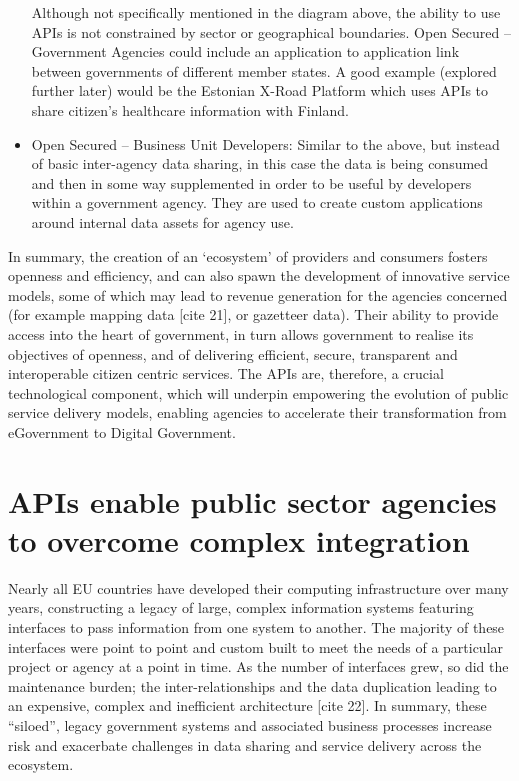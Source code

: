 \begin{itemize}
	 Although not specifically mentioned in the diagram above, the ability to use
	 APIs is not constrained by sector or geographical boundaries. Open Secured
	 – Government Agencies could include an application to application link
	 between governments of different member states. A good example (explored
	 further later) would be the Estonian X-Road Platform which uses APIs to
	 share citizen’s healthcare information with Finland.
	 \item Open Secured – Business Unit Developers: Similar to the above, but
	 instead of basic inter-agency data sharing, in this case the data is being
	 consumed and then in some way supplemented in order to be useful by developers
	 within a government agency. They are used to create custom applications around
	 internal data assets for agency use.
\end{itemize}

In summary, the creation of an ‘ecosystem’ of providers and consumers fosters
openness and efficiency, and can also spawn the development of innovative service
models, some of which may lead to revenue generation for the agencies concerned
(for example mapping data [cite 21], or gazetteer data). Their ability to provide access
into the heart of government, in turn allows government to realise its objectives
of openness, and of delivering efficient, secure, transparent and interoperable
citizen centric services. The APIs are, therefore, a crucial technological
component, which will underpin empowering the evolution of public service delivery
models, enabling agencies to accelerate their transformation from eGovernment to
Digital Government.

\section{APIs enable public sector agencies to overcome complex integration}

Nearly all EU countries have developed their computing infrastructure over
many years, constructing a legacy of large, complex information systems featuring
interfaces to pass information from one system to another. The majority of these
interfaces were point to point and custom built to meet the needs of a particular
project or agency at a point in time. As the number of interfaces grew, so did the
maintenance burden; the inter-relationships and the data duplication leading to an
expensive, complex and inefficient architecture [cite 22]. In summary, these
“siloed”, legacy government systems and associated business processes increase
risk and exacerbate challenges in data sharing and service delivery across the
ecosystem.

